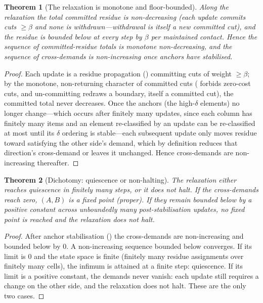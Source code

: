 \documentclass[11pt,a4paper]{article}
\theoremstyle{thmstyle}
\newtheorem{theorem}{Theorem}[section]
\theoremstyle{definition}
\theoremstyle{remark}
\newcommand{\flo}{\beta}               %
\newcommand{\abl}{\delta}              %
\newcommand{\colA}{A}                  %
\newcommand{\colB}{B}                  %
\begin{document}
\begin{theorem}[The relaxation is monotone and floor-bounded]
\label{thm:monotone}
Along the relaxation the total committed residue is non-decreasing (each
update commits cuts $\ge\flo$ and none is withdrawn---withdrawal is itself a
new committed cut), and the residue is bounded below at every step by $\flo$
per maintained contact. Hence the sequence of committed-residue totals is
monotone non-decreasing, and the sequence of cross-demands is non-increasing
once anchors have stabilised.
\end{theorem}

\begin{proof}
Each update is a residue propagation () committing cuts
of weight $\ge\flo$; by the monotone, non-returning character of committed
cuts ( forbids zero-cost cuts, and un-committing redraws a
boundary, itself a committed cut), the committed total never decreases. Once
the anchors (the high-$\abl$ elements) no longer change---which occurs after
finitely many updates, since each column has finitely many items and an
element re-classified by an update can be re-classified at most until its
$\abl$ ordering is stable---each subsequent update only moves residue toward
satisfying the other side's demand, which by definition reduces that
direction's cross-demand or leaves it unchanged. Hence cross-demands are
non-increasing thereafter.
\end{proof}

\begin{theorem}[Dichotomy: quiescence or non-halting]
\label{thm:dichotomy}
The relaxation either reaches quiescence in finitely many steps, or it does
not halt. If the cross-demands reach zero, $(\colA,\colB)$ is a fixed point
(proper). If they remain bounded below by a positive constant across
unboundedly many post-stabilisation updates, no fixed point is reached and
the relaxation does not halt.
\end{theorem}

\begin{proof}
After anchor stabilisation () the cross-demands are
non-increasing and bounded below by $0$. A non-increasing sequence bounded
below converges. If its limit is $0$ and the state space is finite (finitely
many residue assignments over finitely many cells), the infimum is attained
at a finite step: quiescence. If its limit is a positive constant, the
demands never vanish: each update still requires a change on the other side,
and the relaxation does not halt. These are the only two cases.
\end{proof}
\end{document}
